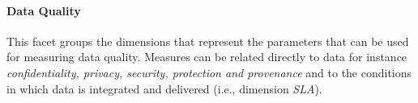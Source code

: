 \paragraph{Data Quality} 
This facet groups the dimensions that represent the parameters that can be used for measuring data quality. Measures can be related directly to data for instance {\em confidentiality, privacy, security, protection and provenance} and to the conditions in which data is integrated and delivered  (i.e., dimension {\em SLA}).


